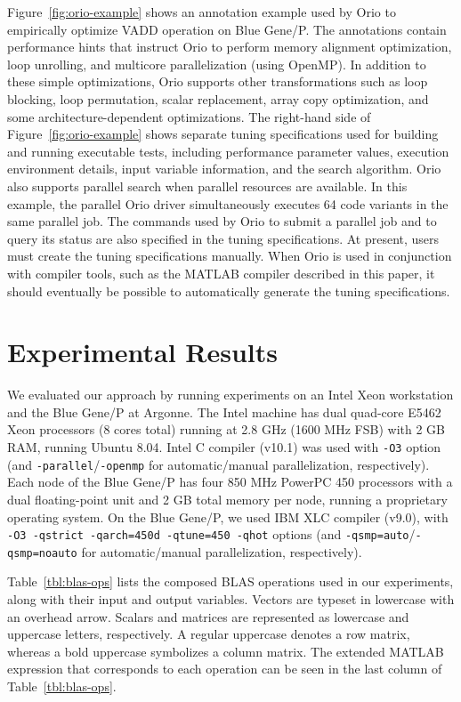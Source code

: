 \documentclass[runningheads]{llncs}
\begin{document}
Figure~\ref{fig:orio-example} shows an annotation example used by Orio to
empirically optimize VADD operation on Blue Gene/P. The annotations contain
performance hints that instruct Orio to perform memory alignment
optimization, loop unrolling, and multicore parallelization (using
OpenMP). In addition to these simple optimizations, Orio supports other
transformations such as loop blocking, loop permutation, scalar replacement,
array copy optimization, and some architecture-dependent optimizations. The
right-hand side of Figure~\ref{fig:orio-example} shows separate tuning
specifications used for building and running executable tests, including
performance parameter values, execution environment details, input variable
information, and the search algorithm. Orio also supports parallel search
when parallel resources are available. In this example, the parallel Orio
driver simultaneously executes 64 code variants in the same parallel job. The
commands used by Orio to submit a parallel job and to query its status are
also specified in the tuning specifications. At present, users must create
the tuning specifications manually. When Orio is used in conjunction with
compiler tools, such as the MATLAB compiler described in this paper, it
should eventually be possible to automatically generate the tuning
specifications.


\section{Experimental Results}
\label{sec:experiments}

We evaluated our approach by running experiments on an Intel Xeon
workstation and the Blue Gene/P at Argonne. The Intel machine has dual
quad-core E5462 Xeon processors (8 cores total) running at 2.8 GHz
(1600 MHz FSB) with 2 GB RAM, running Ubuntu 8.04. Intel C compiler
(v10.1) was used with \texttt{-O3} option (and
\texttt{-parallel}/\texttt{-openmp} for automatic/manual
parallelization, respectively). Each node of the Blue Gene/P has four
850 MHz PowerPC 450 processors with a dual floating-point unit and 2
GB total memory per node, running a proprietary operating system. On the
Blue Gene/P, we used IBM XLC compiler (v9.0), with \texttt{-O3
-qstrict -qarch=450d -qtune=450 -qhot} options (and
\texttt{-qsmp=auto}/\texttt{-qsmp=noauto} for automatic/manual
parallelization, respectively).

Table~\ref{tbl:blas-ops} lists the composed BLAS operations used in our
experiments, along with their input and output variables. Vectors are typeset
in lowercase with an overhead arrow. Scalars and matrices are represented as
lowercase and uppercase letters, respectively. A regular uppercase denotes a
row matrix, whereas a bold uppercase symbolizes a column matrix. The extended
MATLAB expression that corresponds to each operation can be seen in the last
column of Table~\ref{tbl:blas-ops}.
\end{document}
